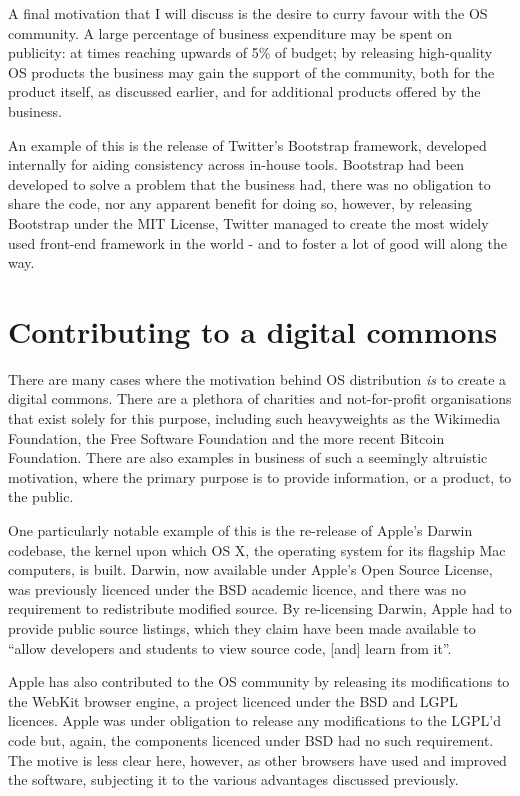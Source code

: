 \documentclass[a4paper]{article}
\begin{document}
A final motivation that I will discuss is the desire to curry favour with the OS community. A large percentage of business expenditure may be spent on publicity: at times reaching upwards of 5\% of budget\cite{advbudget}; by releasing high-quality OS products the business may gain the support of the community, both for the product itself, as discussed earlier, and for additional products offered by the business.

An example of this is the release of Twitter’s Bootstrap\cite{bootstrap} framework, developed internally for aiding consistency across in-house tools\cite{bootstrappress}. Bootstrap had been developed to solve a problem that the business had, there was no obligation to share the code, nor any apparent benefit for doing so, however, by releasing Bootstrap under the MIT License, Twitter managed to create the most widely used front-end framework in the world\cite{bootstrapblog} - and to foster a lot of good will along the way\cite{bootstrapmoney}.

\section{Contributing to a digital commons}

There are many cases where the motivation behind OS distribution \textit{is} to create a digital commons. There are a plethora of charities and not-for-profit organisations that exist solely for this purpose, including such heavyweights as the Wikimedia Foundation\cite{wikimedia}, the Free Software Foundation\cite{fsf} and the more recent Bitcoin Foundation\cite{bitcoin}. There are also examples in business of such a seemingly altruistic motivation, where the primary purpose is to provide information, or a product, to the public.

One particularly notable example of this is the re-release of Apple’s\cite{apple} Darwin codebase, the kernel upon which OS X, the operating system for its flagship Mac computers, is built. Darwin, now available under Apple’s Open Source License\cite{apsl}, was previously licenced under the BSD academic licence, and there was no requirement to redistribute modified source. By re-licensing Darwin, Apple had to provide public source listings, which they claim have been made available to “allow developers and students to view source code, [and] learn from it”\cite{appleos}.

Apple has also contributed to the OS community by releasing its modifications to the WebKit browser engine, a project licenced under the BSD and LGPL licences. Apple was under obligation to release any modifications to the LGPL’d code but, again, the components licenced under BSD had no such requirement\cite{appleos}. The motive is less clear here, however, as other browsers\cite{webkitfork} have used and improved the software, subjecting it to the various advantages discussed previously.
\end{document}
